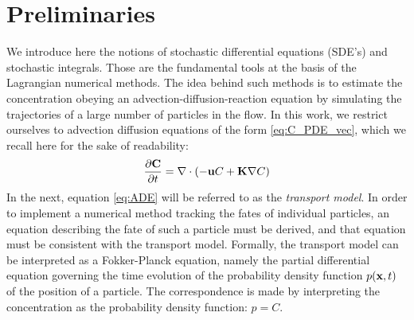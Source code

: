 \section{Preliminaries}
We introduce here the notions of stochastic differential equations (SDE's) and stochastic integrals. Those are the fundamental tools at the basis of the Lagrangian numerical methods. The idea behind such methods is to estimate the concentration obeying an advection-diffusion-reaction equation by simulating the trajectories of a large number of particles in the flow. In this work, we restrict ourselves to advection diffusion equations of the form \eqref{eq:C_PDE_vec}, which we recall here for the sake of readability:
\begin{equation} \label{eq:ADE}
	\frac{\partial \mathbf C}{\partial t} = \nabla \cdot (-\mathbf u C + \mathbf K \nabla C)
\end{equation}
In the next, equation \eqref{eq:ADE} will be referred to as the \textit{transport model}. In order to implement a numerical method tracking the fates of individual particles, an equation describing the fate of such a particle must be derived, and that equation must be consistent with the transport model. Formally, the transport model can be interpreted as a Fokker-Planck equation, namely the partial differential equation governing the time evolution of the probability density function $p(\mathbf x,t)$ of the position of a particle. The correspondence is made by interpreting the concentration as the probability density function: $p=C$. 

